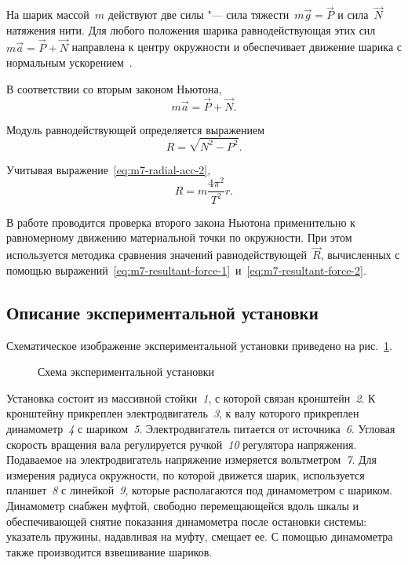 \documentclass[a4paper, 12pt]{extarticle}
\begin{document}
На шарик массой~$m$ действуют две силы "--- сила тяжести~$m\vec{g} = \vec{P}$ и сила~$\vec{N}$ натяжения нити. Для любого положения шарика равнодействующая этих сил~$m\vec{a} = \vec{P} + \vec{N}$ направлена к центру окружности и обеспечивает движение шарика с нормальным ускорением~.

В соответствии со вторым законом Ньютона, %
\begin{equation}
\label{eq:m7-2nd-newton's-law}
m\vec{a} = \vec{P} + \vec{N}.
\end{equation}

Модуль равнодействующей определяется выражением
\begin{equation}
\label{eq:m7-resultant-force-1}
R = \sqrt{N^2 - P^2}.
\end{equation}

Учитывая выражение~\eqref{eq:m7-radial-acc-2},
\begin{equation}
\label{eq:m7-resultant-force-2}
R = m\frac{4\pi^2}{T^2}r.
\end{equation}

В работе проводится проверка второго закона Ньютона применительно к равномерному движению материальной точки по окружности. При этом используется методика сравнения значений равнодействующей~$\vec{R}$, вычисленных с помощью выражений~\eqref{eq:m7-resultant-force-1}~и~\eqref{eq:m7-resultant-force-2}.

\subsection{Описание экспериментальной установки}
Схематическое изображение  экспериментальной установки приведено на рис.~\ref{fig:m7-equipment}.

\begin{figure}[h] %
\begin{center}
\end{center}
\caption{Схема экспериментальной установки \label{fig:m7-equipment}}
\end{figure}

Установка состоит из массивной стойки~\emph{1}, с которой связан кронштейн~\emph{2}. К кронштейну прикреплен электродвигатель~\emph{3}, к валу которого прикреплен динамометр~\emph{4} с шариком~\emph{5}. Электродвигатель питается от источника~\emph{6}. Угловая скорость вращения вала регулируется ручкой~\emph{10} регулятора напряжения. Подаваемое на электродвигатель напряжение измеряется вольтметром~\emph{7}. Для измерения радиуса окружности, по которой движется шарик, используется планшет~\emph{8} с линейкой~\emph{9}, которые располагаются под динамометром с шариком. Динамометр снабжен муфтой, свободно перемещающейся  вдоль шкалы и обеспечивающей снятие показания динамометра после остановки системы: указатель пружины, надавливая на муфту, смещает ее. С помощью динамометра также производится взвешивание шариков. 
\end{document}
